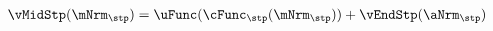   \begin{equation}\begin{gathered}\begin{aligned}
\vMidStp(\mNrm_{\stp}) & = \uFunc(\cFunc_{\stp}(\mNrm_{\stp})) + \vEndStp(\aNrm_{\stp}) \label{eq:vMidStp}
      \end{aligned}\end{gathered}\end{equation}

